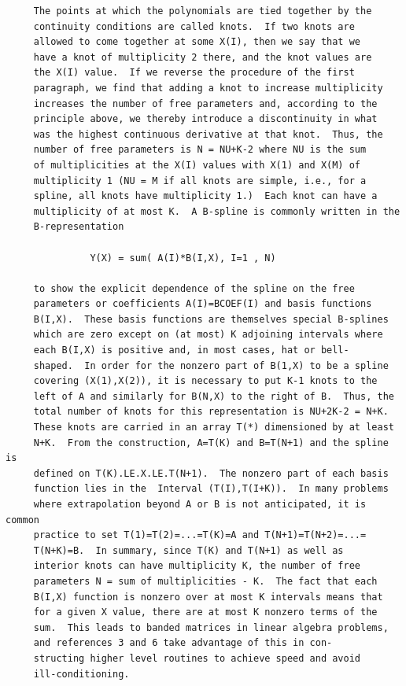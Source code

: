 \documentclass[11pt,twoside]{article}
\begin{document}
\begin{verbatim}
     The points at which the polynomials are tied together by the
     continuity conditions are called knots.  If two knots are
     allowed to come together at some X(I), then we say that we
     have a knot of multiplicity 2 there, and the knot values are
     the X(I) value.  If we reverse the procedure of the first
     paragraph, we find that adding a knot to increase multiplicity
     increases the number of free parameters and, according to the
     principle above, we thereby introduce a discontinuity in what
     was the highest continuous derivative at that knot.  Thus, the
     number of free parameters is N = NU+K-2 where NU is the sum
     of multiplicities at the X(I) values with X(1) and X(M) of
     multiplicity 1 (NU = M if all knots are simple, i.e., for a
     spline, all knots have multiplicity 1.)  Each knot can have a
     multiplicity of at most K.  A B-spline is commonly written in the
     B-representation

               Y(X) = sum( A(I)*B(I,X), I=1 , N)

     to show the explicit dependence of the spline on the free
     parameters or coefficients A(I)=BCOEF(I) and basis functions
     B(I,X).  These basis functions are themselves special B-splines
     which are zero except on (at most) K adjoining intervals where
     each B(I,X) is positive and, in most cases, hat or bell-
     shaped.  In order for the nonzero part of B(1,X) to be a spline
     covering (X(1),X(2)), it is necessary to put K-1 knots to the
     left of A and similarly for B(N,X) to the right of B.  Thus, the
     total number of knots for this representation is NU+2K-2 = N+K.
     These knots are carried in an array T(*) dimensioned by at least
     N+K.  From the construction, A=T(K) and B=T(N+1) and the spline is
     defined on T(K).LE.X.LE.T(N+1).  The nonzero part of each basis
     function lies in the  Interval (T(I),T(I+K)).  In many problems
     where extrapolation beyond A or B is not anticipated, it is common
     practice to set T(1)=T(2)=...=T(K)=A and T(N+1)=T(N+2)=...=
     T(N+K)=B.  In summary, since T(K) and T(N+1) as well as
     interior knots can have multiplicity K, the number of free
     parameters N = sum of multiplicities - K.  The fact that each
     B(I,X) function is nonzero over at most K intervals means that
     for a given X value, there are at most K nonzero terms of the
     sum.  This leads to banded matrices in linear algebra problems,
     and references 3 and 6 take advantage of this in con-
     structing higher level routines to achieve speed and avoid
     ill-conditioning.


\end{verbatim}
\end{document}
